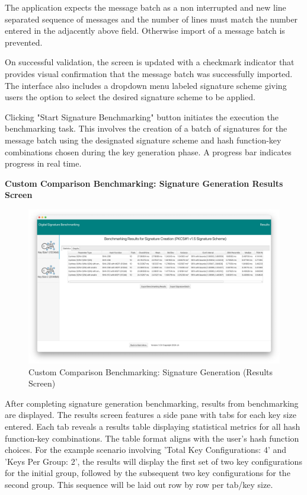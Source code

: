 \documentclass[]{final_report}
\begin{document}
The application expects the message batch as a non interrupted and new line separated sequence of messages and the number of lines must match the number entered in the adjacently above field. Otherwise import of a message batch is prevented.

On successful validation, the screen is updated with a checkmark indicator that provides visual confirmation that the message batch was successfully imported. The interface also includes a dropdown menu labeled signature scheme giving users the option to select the desired signature scheme  to be applied. 


Clicking "Start Signature Benchmarking" button initiates the execution the benchmarking task. This involves the creation of a batch of signatures for the message batch using the designated signature scheme and hash function-key combinations chosen during the key generation phase. A progress bar indicates progress in real time.

\textbf{Custom Comparison Benchmarking: Signature Generation Results Screen}


\begin{figure}[H]
    \centering
    \includegraphics[scale= 0.325]{main_pictures/ui/custom9.png}
   \caption{Custom Comparison Benchmarking: Signature Generation (Results Screen)}
\end{figure}

After completing signature generation benchmarking, results from benchmarking are displayed. The results screen features a side pane with tabs for each key size entered. Each tab reveals a results table displaying statistical metrics for all hash function-key combinations.
The table format aligns with the user's hash function choices. For the example scenario involving ’Total Key Configurations: 4’ and ’Keys Per Group: 2’, the results will display the first set of two key configurations for the initial group, followed by the subsequent two key configurations for the second group. This sequence will be laid out row by row per tab/key size.
\end{document}

